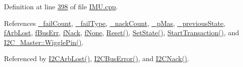 Definition at line \hyperlink{_i_m_u_8cpp_source_l00398}{398} of file \hyperlink{_i_m_u_8cpp_source}{IMU.cpp}.



References \hyperlink{_i_m_u_8h_source_l00108}{\_\-failCount}, \hyperlink{_i_m_u_8h_source_l00087}{\_\-failType}, \hyperlink{_i_m_u_8h_source_l00109}{\_\-nackCount}, \hyperlink{_i_m_u_8h_source_l00089}{\_\-pMas}, \hyperlink{_i_m_u_8h_source_l00086}{\_\-previousState}, \hyperlink{_i_m_u_8h_source_l00069}{fArbLost}, \hyperlink{_i_m_u_8h_source_l00068}{fBusErr}, \hyperlink{_i_m_u_8h_source_l00067}{fNack}, \hyperlink{_i_m_u_8h_source_l00066}{fNone}, \hyperlink{_i_m_u_8cpp_source_l00153}{Reset()}, \hyperlink{_i_m_u_8h_source_l00178}{SetState()}, \hyperlink{_i_m_u_8cpp_source_l00323}{StartTransaction()}, and \hyperlink{class_i2_c___master_a78ebdbf58c7a0ee05bdca47349dee54a}{I2C\_\-Master::WigglePin()}.



Referenced by \hyperlink{_i_m_u_8cpp_source_l00534}{I2CArbLost()}, \hyperlink{_i_m_u_8cpp_source_l00499}{I2CBusError()}, and \hyperlink{_i_m_u_8cpp_source_l00463}{I2CNack()}.


